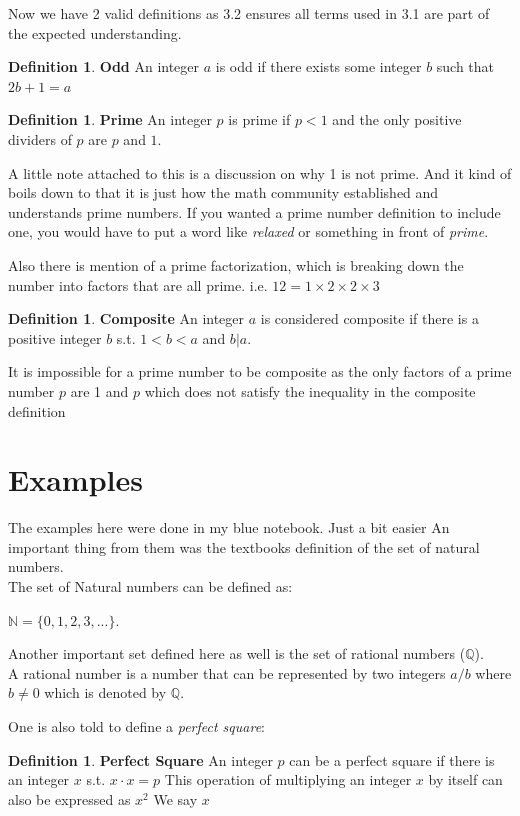 \documentclass{article}
\theoremstyle{definition}
\theoremstyle{definition}
\newtheorem{dfn}[thm]{Definition}
\begin{document}
Now we have 2 valid definitions as 3.2 ensures all terms used in 3.1 are part of
the expected understanding.
\begin{dfn}\textbf{Odd}
An integer $a$ is odd if there exists some integer $b$ such that $2b + 1 = a $ 
\end{dfn}
\begin{dfn}\textbf{Prime} 
    An integer $p$ is prime if $p < 1$ and the only positive dividers of $p$ are
    $p$ and $1$.
\end{dfn}
    
A little note attached to this is a discussion on why 1 is not prime. And it kind
of boils down to that it is just how the math community established and understands prime
numbers. If you wanted a prime number definition to include one, you would have to
put a word like \textit{relaxed} or something in front of \textit{prime}.

Also there is mention of a prime factorization, which is breaking down the number into
factors that are all prime. i.e. $12 = 1\times2\times2\times3$
\begin{dfn}\textbf{Composite}
    An integer $a$ is considered composite if there is a positive integer $b$ s.t.
    $1 < b < a$ and $b|a$.
\end{dfn}

It is impossible for a prime number to be composite as the only factors of a prime
number $p$ are 1 and $p$ which does not satisfy the inequality in the composite
definition


\section*{Examples}
The examples here were done in my blue notebook. Just a bit easier
An important thing from them was the textbooks definition of the set of natural
numbers.
\\[\baselineskip ]
The set of Natural numbers can be defined as:
\begin{center}
$\mathbb{N} = \{0,1,2,3,...\}.$
\end{center}
Another important set defined here as well is the set of rational numbers ($\mathbb{Q}$).
\\[\baselineskip]
A rational number is a number that can be represented by two integers $a/b$ where
$b \not= 0$ which is denoted by $\mathbb{Q}$.

One is also told to define a \textit{perfect square}:
\begin{dfn} \textbf{Perfect Square}
   An integer $p$ can be a perfect square if there is an integer $x$ s.t. $x \cdot x = p$
   This operation of multiplying an integer $x$ by itself can also be expressed as $x^2$
   We say $x$ 
\end{dfn}
\end{document}
